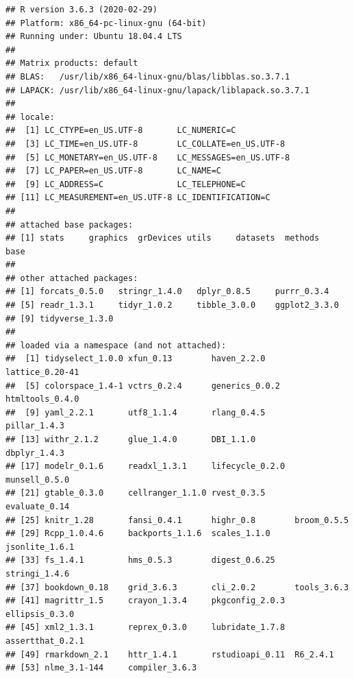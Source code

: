 \documentclass[]{bxjsreport}
\begin{document}
\begin{verbatim}
## R version 3.6.3 (2020-02-29)
## Platform: x86_64-pc-linux-gnu (64-bit)
## Running under: Ubuntu 18.04.4 LTS
## 
## Matrix products: default
## BLAS:   /usr/lib/x86_64-linux-gnu/blas/libblas.so.3.7.1
## LAPACK: /usr/lib/x86_64-linux-gnu/lapack/liblapack.so.3.7.1
## 
## locale:
##  [1] LC_CTYPE=en_US.UTF-8       LC_NUMERIC=C              
##  [3] LC_TIME=en_US.UTF-8        LC_COLLATE=en_US.UTF-8    
##  [5] LC_MONETARY=en_US.UTF-8    LC_MESSAGES=en_US.UTF-8   
##  [7] LC_PAPER=en_US.UTF-8       LC_NAME=C                 
##  [9] LC_ADDRESS=C               LC_TELEPHONE=C            
## [11] LC_MEASUREMENT=en_US.UTF-8 LC_IDENTIFICATION=C       
## 
## attached base packages:
## [1] stats     graphics  grDevices utils     datasets  methods   base     
## 
## other attached packages:
## [1] forcats_0.5.0   stringr_1.4.0   dplyr_0.8.5     purrr_0.3.4    
## [5] readr_1.3.1     tidyr_1.0.2     tibble_3.0.0    ggplot2_3.3.0  
## [9] tidyverse_1.3.0
## 
## loaded via a namespace (and not attached):
##  [1] tidyselect_1.0.0 xfun_0.13        haven_2.2.0      lattice_0.20-41 
##  [5] colorspace_1.4-1 vctrs_0.2.4      generics_0.0.2   htmltools_0.4.0 
##  [9] yaml_2.2.1       utf8_1.1.4       rlang_0.4.5      pillar_1.4.3    
## [13] withr_2.1.2      glue_1.4.0       DBI_1.1.0        dbplyr_1.4.3    
## [17] modelr_0.1.6     readxl_1.3.1     lifecycle_0.2.0  munsell_0.5.0   
## [21] gtable_0.3.0     cellranger_1.1.0 rvest_0.3.5      evaluate_0.14   
## [25] knitr_1.28       fansi_0.4.1      highr_0.8        broom_0.5.5     
## [29] Rcpp_1.0.4.6     backports_1.1.6  scales_1.1.0     jsonlite_1.6.1  
## [33] fs_1.4.1         hms_0.5.3        digest_0.6.25    stringi_1.4.6   
## [37] bookdown_0.18    grid_3.6.3       cli_2.0.2        tools_3.6.3     
## [41] magrittr_1.5     crayon_1.3.4     pkgconfig_2.0.3  ellipsis_0.3.0  
## [45] xml2_1.3.1       reprex_0.3.0     lubridate_1.7.8  assertthat_0.2.1
## [49] rmarkdown_2.1    httr_1.4.1       rstudioapi_0.11  R6_2.4.1        
## [53] nlme_3.1-144     compiler_3.6.3
\end{verbatim}


\end{document}
